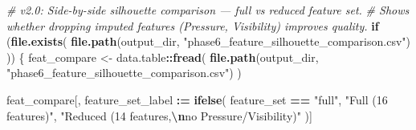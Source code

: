 \documentclass[
]{article}
\newenvironment{Shaded}{\begin{snugshade}}{\end{snugshade}}
\newcommand{\CommentTok}[1]{\textcolor[rgb]{0.56,0.35,0.01}{\textit{#1}}}
\newcommand{\ControlFlowTok}[1]{\textcolor[rgb]{0.13,0.29,0.53}{\textbf{#1}}}
\newcommand{\FunctionTok}[1]{\textcolor[rgb]{0.13,0.29,0.53}{\textbf{#1}}}
\newcommand{\NormalTok}[1]{#1}
\newcommand{\OtherTok}[1]{\textcolor[rgb]{0.56,0.35,0.01}{#1}}
\newcommand{\SpecialCharTok}[1]{\textcolor[rgb]{0.81,0.36,0.00}{\textbf{#1}}}
\newcommand{\StringTok}[1]{\textcolor[rgb]{0.31,0.60,0.02}{#1}}
\begin{document}
\begin{Shaded}
\begin{Highlighting}[]
\CommentTok{\# v2.0: Side{-}by{-}side silhouette comparison — full vs reduced feature set.}
\CommentTok{\# Shows whether dropping imputed features (Pressure, Visibility) improves quality.}
\ControlFlowTok{if}\NormalTok{ (}\FunctionTok{file.exists}\NormalTok{(}
  \FunctionTok{file.path}\NormalTok{(output\_dir, }\StringTok{"phase6\_feature\_silhouette\_comparison.csv"}\NormalTok{)}
\NormalTok{)) \{}
\NormalTok{  feat\_compare }\OtherTok{\textless{}{-}}\NormalTok{ data.table}\SpecialCharTok{::}\FunctionTok{fread}\NormalTok{(}
    \FunctionTok{file.path}\NormalTok{(output\_dir, }\StringTok{"phase6\_feature\_silhouette\_comparison.csv"}\NormalTok{)}
\NormalTok{  )}

\NormalTok{  feat\_compare[, feature\_set\_label }\SpecialCharTok{:=} \FunctionTok{ifelse}\NormalTok{(}
\NormalTok{    feature\_set }\SpecialCharTok{==} \StringTok{"full"}\NormalTok{,}
    \StringTok{"Full (16 features)"}\NormalTok{,}
    \StringTok{"Reduced (14 features,}\SpecialCharTok{\textbackslash{}n}\StringTok{no Pressure/Visibility)"}
\NormalTok{  )]}


\end{Highlighting}
\end{Shaded}
\end{document}
